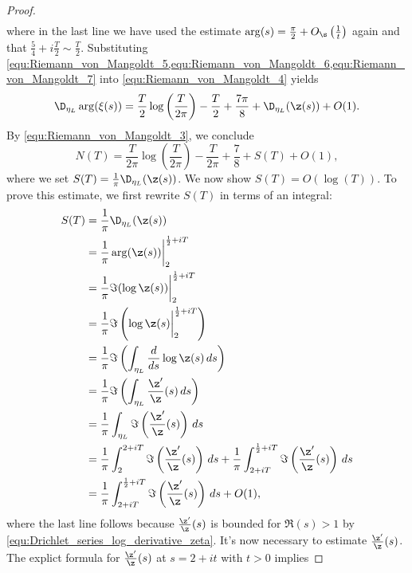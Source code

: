 \begin{proof}
\begin{equation}
\begin{aligned}
          \end{aligned}
        \end{equation}
        where in the last line we have used the estimate $\arg(s) = \frac{\pi}{2}+O_{\s}\left(\frac{1}{t}\right)$ again and that $\frac{5}{4}+i\frac{T}{2} \sim \frac{T}{2}$. Substituting \cref{equ:Riemann_von_Mangoldt_5,equ:Riemann_von_Mangoldt_6,equ:Riemann_von_Mangoldt_7} into \cref{equ:Riemann_von_Mangoldt_4} yields
        \[
          \D_{\eta_{L}}\arg(\xi(s)) = \frac{T}{2}\log\left(\frac{T}{2\pi}\right)-\frac{T}{2}+\frac{7\pi}{8}+\D_{\eta_{L}}(\z(s))+O(1).
        \]
        By \cref{equ:Riemann_von_Mangoldt_3}, we conclude
        \begin{equation}\label{equ:Riemann_von_Mangoldt_8}
          N(T) = \frac{T}{2\pi}\log\left(\frac{T}{2\pi}\right)-\frac{T}{2\pi}+\frac{7}{8}+S(T)+O(1),
        \end{equation}
        where we set $S(T) = \frac{1}{\pi}\D_{\eta_{L}}(\z(s))$. We now show $S(T) = O(\log(T))$. To prove this estimate, we first rewrite $S(T)$ in terms of an integral:
        \begin{equation}\label{equ:Riemann_von_Mangoldt_9}
          \begin{aligned}
            S(T) &= \frac{1}{\pi}\D_{\eta_{L}}(\z(s)) \\
            &= \frac{1}{\pi}\arg(\z(s))\bigg|_{2}^{\frac{1}{2}+iT} \\
            &= \frac{1}{\pi}\Im(\log\z(s))\bigg|_{2}^{\frac{1}{2}+iT} \\
            &= \frac{1}{\pi}\Im\left(\log\z(s)\bigg|_{2}^{\frac{1}{2}+iT}\right) \\
            &= \frac{1}{\pi}\Im\left(\int_{\eta_{L}}\frac{d}{ds}\log\z(s)\,ds\right) \\
            &= \frac{1}{\pi}\Im\left(\int_{\eta_{L}}\frac{\z'}{\z}(s)\,ds\right) \\
            &= \frac{1}{\pi}\int_{\eta_{L}}\Im\left(\frac{\z'}{\z}(s)\right)\,ds \\
            &= \frac{1}{\pi}\int_{2}^{2+iT}\Im\left(\frac{\z'}{\z}(s)\right)\,ds+\frac{1}{\pi}\int_{2+iT}^{\frac{1}{2}+iT}\Im\left(\frac{\z'}{\z}(s)\right)\,ds \\
            &= \frac{1}{\pi}\int_{2+iT}^{\frac{1}{2}+iT}\Im\left(\frac{\z'}{\z}(s)\right)\,ds+O(1),
          \end{aligned}
        \end{equation}
        where the last line follows because $\frac{\z'}{\z}(s)$ is bounded for $\Re(s) > 1$ by \cref{equ:Drichlet_series_log_derivative_zeta}. It's now necessary to estimate $\frac{\z'}{\z}(s)$. The explict formula for $\frac{\z'}{\z}(s)$ at $s = 2+it$ with $t > 0$ implies

\end{proof}
